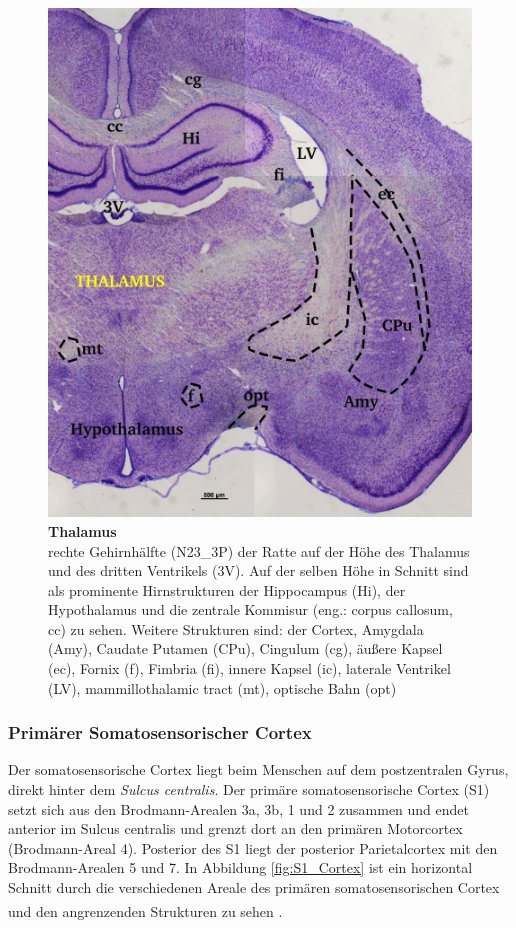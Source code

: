 \documentclass[12pt,a4paper,pdftex]{article}
\begin{document}
\begin{figure}[H]
    \centering
    \includegraphics{pictures/somatosensory/thalamus_somato.png}
    \caption[Thalamus]{\textbf{Thalamus}\\
    rechte Gehirnhälfte (N23\_3P) der Ratte auf der Höhe des Thalamus und des dritten Ventrikels (3V). Auf der selben Höhe in Schnitt sind als prominente Hirnstrukturen der Hippocampus (Hi), der Hypothalamus und die zentrale Kommisur (eng.: corpus callosum, cc) zu sehen. Weitere Strukturen sind: der Cortex, Amygdala (Amy), Caudate Putamen (CPu), Cingulum (cg), äußere Kapsel (ec), Fornix (f), Fimbria (fi), innere Kapsel (ic), laterale Ventrikel (LV), mammillothalamic tract (mt), optische Bahn (opt)}
    \label{fig:thalamus_somato}
\end{figure}

\subsubsection*{Primärer Somatosensorischer Cortex}
Der somatosensorische Cortex liegt beim Menschen auf dem postzentralen Gyrus, direkt hinter dem \textit{Sulcus centralis}. Der primäre somatosensorische Cortex (S1) setzt sich aus den Brodmann-Arealen 3a, 3b, 1 und 2 zusammen und endet anterior im Sulcus centralis und grenzt dort an den primären Motorcortex (Brodmann-Areal 4). Posterior des S1 liegt der posterior Parietalcortex mit den Brodmann-Arealen 5 und 7. In Abbildung \ref{fig:S1_Cortex} ist ein horizontal Schnitt durch die verschiedenen Areale des primären somatosensorischen Cortex und den angrenzenden Strukturen zu sehen \textsuperscript{\cite[23]{kandel2013principles}}. 
\end{document}
